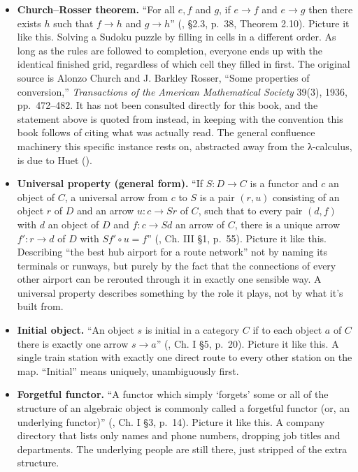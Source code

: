 \begin{itemize}
\item
  \textbf{Church--Rosser theorem.} ``For all \(e, f\) and \(g\), if \(e \to f\) and \(e \to g\) then there exists \(h\) such that \(f \to h\) and \(g \to h\)'' (\cite{Thompson1991}, §2.3, p.~38, Theorem 2.10). Picture it like this. Solving a Sudoku puzzle by filling in cells in a different order. As long as the rules are followed to completion, everyone ends up with the identical finished grid, regardless of which cell they filled in first. The original source is Alonzo Church and J. Barkley Rosser, ``Some properties of conversion,'' \emph{Transactions of the American Mathematical Society} 39(3), 1936, pp.~472--482. It has not been consulted directly for this book, and the statement above is quoted from \cite{Thompson1991} instead, in keeping with the convention this book follows of citing what was actually read. The general confluence machinery this specific instance rests on, abstracted away from the λ-calculus, is due to Huet (\cite{Huet1980}).
\item
  \textbf{Universal property (general form).} ``If \(S : D \to C\) is a functor and \(c\) an object of \(C\), a universal arrow from \(c\) to \(S\) is a pair \((r, u)\) consisting of an object \(r\) of \(D\) and an arrow \(u : c \to Sr\) of \(C\), such that to every pair \((d, f)\) with \(d\) an object of \(D\) and \(f : c \to Sd\) an arrow of \(C\), there is a unique arrow \(f' : r \to d\) of \(D\) with \(Sf' \circ u = f\)'' (\cite{MacLane1998}, Ch. III §1, p.~55). Picture it like this. Describing ``the best hub airport for a route network'' not by naming its terminals or runways, but purely by the fact that the connections of every other airport can be rerouted through it in exactly one sensible way. A universal property describes something by the role it plays, not by what it's built from.
\item
  \textbf{Initial object.} ``An object \(s\) is initial in a category \(C\) if to each object \(a\) of \(C\) there is exactly one arrow \(s \to a\)'' (\cite{MacLane1998}, Ch. I §5, p.~20). Picture it like this. A single train station with exactly one direct route to every other station on the map. ``Initial'' means uniquely, unambiguously first.
\item
  \textbf{Forgetful functor.} ``A functor which simply `forgets' some or all of the structure of an algebraic object is commonly called a forgetful functor (or, an underlying functor)'' (\cite{MacLane1998}, Ch. I §3, p.~14). Picture it like this. A company directory that lists only names and phone numbers, dropping job titles and departments. The underlying people are still there, just stripped of the extra structure.

\end{itemize}
